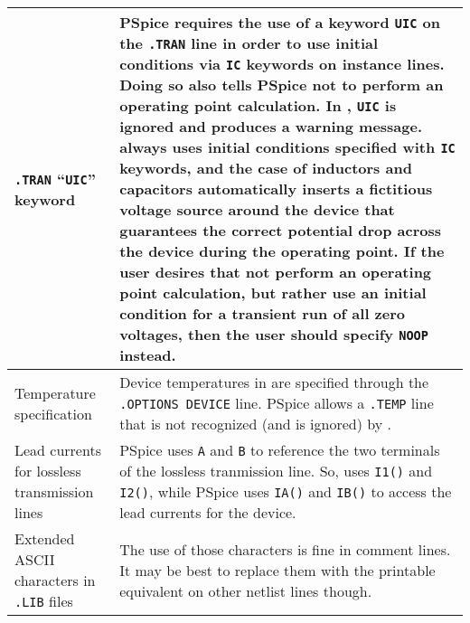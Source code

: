 \begin{longtable}[h] {>{\raggedright\small}m{2in}|>{\raggedright\let\\\tabularnewline\small}m{4in}}

\texttt{.TRAN} ``\texttt{UIC}'' keyword & PSpice requires the use
of a keyword \texttt{UIC} on the \texttt{.TRAN} line in order to use
initial conditions via \texttt{IC} keywords on instance lines.  Doing so 
also tells PSpice not to perform an operating point calculation. In
\Xyce{}, \texttt{UIC} is ignored and produces a warning message.  \Xyce{} 
always uses initial conditions specified with
\texttt{IC} keywords, and the case of inductors and capacitors automatically 
inserts a fictitious voltage source around the device that guarantees 
the correct potential drop across the device during the operating point.  
If the user desires that \Xyce{} not perform an operating point calculation, 
but rather use an initial condition for a transient run of all zero 
voltages, then the user should specify \texttt{NOOP} instead. \\ \hline

Temperature specification & Device temperatures in \Xyce{} are 
specified through the \texttt{.OPTIONS DEVICE} line.  PSpice 
allows a \texttt{.TEMP} line that is not recognized (and is ignored) 
by \Xyce{}. \\ \hline

Lead currents for lossless transmission lines & PSpice uses \texttt{A} and
\texttt{B} to reference the two terminals of the lossless tranmission line.  
So, \Xyce{} uses \texttt{I1()} and \texttt{I2()}, while PSpice uses \texttt{IA()} 
and \texttt{IB()} to access the lead currents for the device. \\ \hline

Extended ASCII characters in \texttt{.LIB} files & The use of those characters 
is fine in \Xyce{} comment lines.  It may be best to replace them with the 
printable equivalent on other \Xyce{} netlist lines though. 
\end{longtable}


